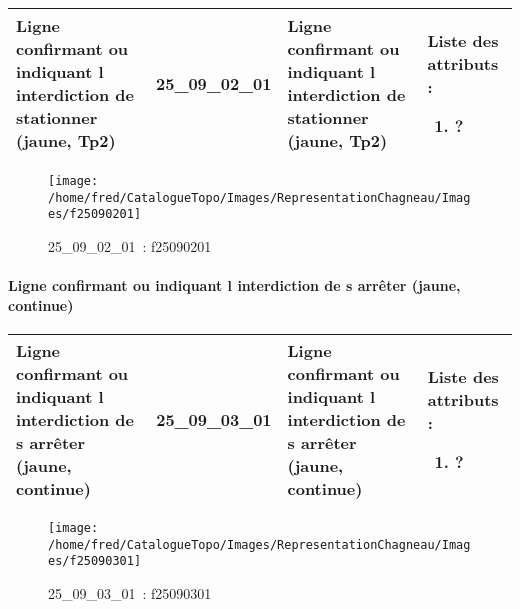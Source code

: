 \documentclass[12pt,titlepage]{book}
\begin{document}
\renewcommand{\arraystretch}{1.2}
\begin{supertabular}{|p{10cm}|c|p{13cm}|p{12cm}|}
 Ligne confirmant ou indiquant l interdiction de stationner (jaune, Tp2) & 25\_09\_02\_01 & Ligne confirmant ou indiquant l interdiction de stationner (jaune, Tp2) & Liste des attributs :
\begin{enumerate}
  \item ?\end{enumerate}
\\
\hline
\end{supertabular}
\begin{figure}[h!]
  \hfill         %
  \begin{minipage}[t]{3cm}
    \begin{center}
      \texttt{[image: /home/fred/CatalogueTopo/Images/RepresentationChagneau/Images/f25090201]}
      \caption[~25\_09\_02\_01]{\small{25\_09\_02\_01~:} \tiny{f25090201}}\label{f25090201}
    \end{center}
  \end{minipage}
\end{figure}


\paragraph{Ligne confirmant ou indiquant l interdiction de s arrêter (jaune, continue)}
\noindent
\vspace{\baselineskip}

\renewcommand{\arraystretch}{1.2}
\begin{supertabular}{|p{10cm}|c|p{13cm}|p{12cm}|}
 Ligne confirmant ou indiquant l interdiction de s arrêter (jaune, continue) & 25\_09\_03\_01 & Ligne confirmant ou indiquant l interdiction de s arrêter (jaune, continue) & Liste des attributs :
\begin{enumerate}
  \item ?\end{enumerate}
\\
\hline
\end{supertabular}
\begin{figure}[h!]
  \hfill         %
  \begin{minipage}[t]{3cm}
    \begin{center}
      \texttt{[image: /home/fred/CatalogueTopo/Images/RepresentationChagneau/Images/f25090301]}
      \caption[~25\_09\_03\_01]{\small{25\_09\_03\_01~:} \tiny{f25090301}}\label{f25090301}
    \end{center}
  \end{minipage}
\end{figure}
\end{document}
